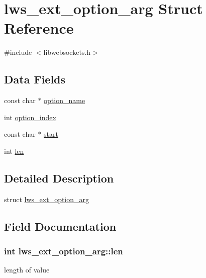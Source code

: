 \hypertarget{structlws__ext__option__arg}{}\section{lws\+\_\+ext\+\_\+option\+\_\+arg Struct Reference}
\label{structlws__ext__option__arg}


{\ttfamily \#include $<$libwebsockets.\+h$>$}

\subsection*{Data Fields}
\begin{DoxyCompactItemize}
\item 
const char $\ast$ \hyperlink{structlws__ext__option__arg_a0a320c56b79271b8f059eeaad9423ac9}{option\+\_\+name}
\item 
int \hyperlink{structlws__ext__option__arg_af57fffcfa253dfa8d98681ac1fb1785f}{option\+\_\+index}
\item 
const char $\ast$ \hyperlink{structlws__ext__option__arg_a0b1f7b30c3ceaf5f1bf9d105c24568d1}{start}
\item 
int \hyperlink{structlws__ext__option__arg_af37f0b6caa7735af51a1ac12b68d5bc5}{len}
\end{DoxyCompactItemize}


\subsection{Detailed Description}
struct \hyperlink{structlws__ext__option__arg}{lws\+\_\+ext\+\_\+option\+\_\+arg} 

\subsection{Field Documentation}
\subsubsection[{\texorpdfstring{len}{len}}]{\setlength{\rightskip}{0pt plus 5cm}int lws\+\_\+ext\+\_\+option\+\_\+arg\+::len}\hypertarget{structlws__ext__option__arg_af37f0b6caa7735af51a1ac12b68d5bc5}{}\label{structlws__ext__option__arg_af37f0b6caa7735af51a1ac12b68d5bc5}
length of value 
